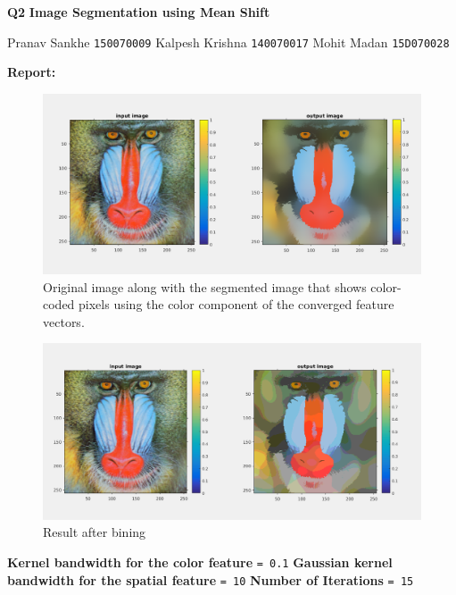 \documentclass{article}
\begin{document}
\textbf{Q2}  
\textbf{ Image Segmentation using Mean Shift}
\vskip 0.2in

Pranav Sankhe \texttt{150070009} \newline
Kalpesh Krishna \texttt{140070017}  \newline
Mohit Madan \texttt{15D070028} \newline

\vskip 0.5in

\textbf{Report:}  
\vskip 0.1in



\begin{figure}[h!]
  \includegraphics[width=\linewidth]{without_bin.png}
  \caption{Original image along with the segmented image that shows color-coded pixels using the color component of the converged feature vectors.}
  \label{fig:result1}
\end{figure}


\begin{figure}[h!]
  \includegraphics[width=\linewidth]{with_bin.png}
  \caption{Result after bining}
  \label{fig:result2}
\end{figure}

\newpage

\textbf{Kernel bandwidth for the color feature} \texttt{= 0.1} \newline
\textbf{Gaussian kernel bandwidth for the spatial feature} \texttt{= 10} \newline
\textbf{Number of Iterations} \texttt{= 15} \newline
\end{document}
